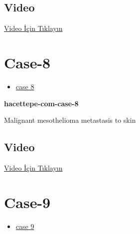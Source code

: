\documentclass[
  letterpaper,
  DIV=11,
  numbers=noendperiod]{scrreprt}
\providecommand{\tightlist}{%
  \setlength{\itemsep}{0pt}\setlength{\parskip}{0pt}}\usepackage{longtable,booktabs,array}
\begin{document}
\hypertarget{video-5}{%
\subsection{Video}\label{video-5}}

\href{https://www.youtube.com/watch?v=FU-Fv7kQPdE}{Video İçin Tıklayın}

\hypertarget{sec-hacettepe-case-of-the-month-case-8}{%
\section{Case-8}\label{sec-hacettepe-case-of-the-month-case-8}}

\begin{itemize}
\tightlist
\item
  \href{https://www.youtube.com/watch?v=c8pDBHRO7t8\&ab_channel=KemalKosemehmetoglu}{case
  8}
\end{itemize}

\textbf{hacettepe-com-case-8}

\begin{tcolorbox}[enhanced jigsaw, colbacktitle=quarto-callout-tip-color!10!white, colback=white, titlerule=0mm, opacityback=0, colframe=quarto-callout-tip-color-frame, opacitybacktitle=0.6, bottomrule=.15mm, breakable, coltitle=black, title=\textcolor{quarto-callout-tip-color}{\faLightbulb}\hspace{0.5em}{Tanı}, toprule=.15mm, toptitle=1mm, bottomtitle=1mm, arc=.35mm, rightrule=.15mm, leftrule=.75mm, left=2mm]

Malignant mesothelioma metastasis to skin

\end{tcolorbox}

\hypertarget{video-6}{%
\subsection{Video}\label{video-6}}

\href{https://www.youtube.com/watch?v=c8pDBHRO7t8}{Video İçin Tıklayın}

\hypertarget{sec-hacettepe-case-of-the-month-case-9}{%
\section{Case-9}\label{sec-hacettepe-case-of-the-month-case-9}}

\begin{itemize}
\tightlist
\item
  \href{https://www.youtube.com/watch?v=9OxpsDNCHWk\&ab_channel=KemalKosemehmetoglu}{case
  9}
\end{itemize}
\end{document}
